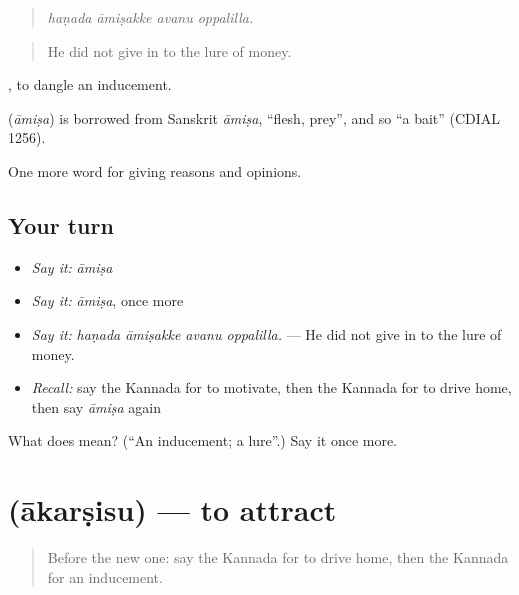 \begin{quote}
\emph{haṇada āmiṣakke avanu oppalilla.}
\end{quote}

\begin{quote}
He did not give in to the lure of money.
\end{quote}

 , to dangle an inducement.

\begin{cousinweb}
\textbf{} (\emph{āmiṣa}) is borrowed from Sanskrit \emph{āmiṣa}, \textquotedblleft{}flesh, prey\textquotedblright{}, and so \textquotedblleft{}a bait\textquotedblright{} (CDIAL 1256).
\end{cousinweb}

\begin{grammarlens}[title={What you've built}]
One more word for giving reasons and opinions.
\end{grammarlens}

\subsection*{Your turn}
\begin{itemize}
\raggedright
  \item \emph{Say it:} \emph{āmiṣa}
  \item \emph{Say it:} \emph{āmiṣa}, once more
  \item \emph{Say it:} \emph{haṇada āmiṣakke avanu oppalilla.} — He did not give in to the lure of money.
  \item \emph{Recall:} say the Kannada for to motivate, then the Kannada for to drive home, then say \emph{āmiṣa} again
\end{itemize}

\begin{tcolorbox}[breakable,colback=teal!4,colframe=teal!35!black,title={Before you move on}]
What does  mean? (\textquotedblleft{}An inducement; a lure\textquotedblright{}.) Say it once more.
\end{tcolorbox}
\section[\texorpdfstring{\kn{ಆಕರ್ಷಿಸು} (ākarṣisu)}{ಆಕರ್ಷಿಸು (ākarṣisu)}]{ (ākarṣisu) — to attract}

\label{lesson:KA-C380-akarsisu}



\begin{quote}
Before the new one: say the Kannada for to drive home, then the Kannada for an inducement.
\end{quote}

